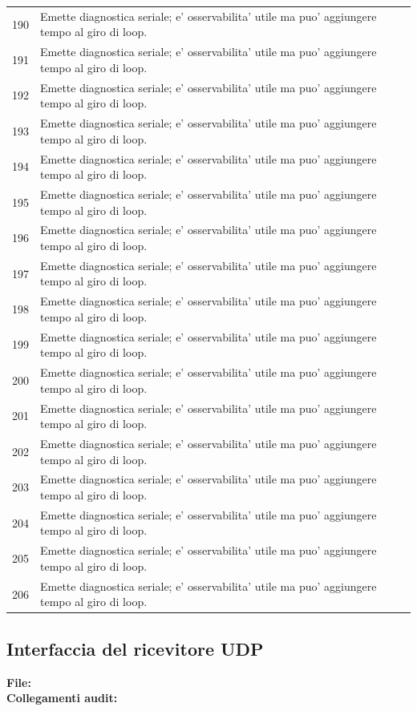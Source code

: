 \documentclass[11pt,a4paper]{article}
\newcommand{\codepath}[1]{\path{#1}}
\begin{document}
\begin{longtable}{p{}p{}}
190 & Emette diagnostica seriale; e' osservabilita' utile ma puo' aggiungere tempo al giro di loop. \\
191 & Emette diagnostica seriale; e' osservabilita' utile ma puo' aggiungere tempo al giro di loop. \\
192 & Emette diagnostica seriale; e' osservabilita' utile ma puo' aggiungere tempo al giro di loop. \\
193 & Emette diagnostica seriale; e' osservabilita' utile ma puo' aggiungere tempo al giro di loop. \\
194 & Emette diagnostica seriale; e' osservabilita' utile ma puo' aggiungere tempo al giro di loop. \\
195 & Emette diagnostica seriale; e' osservabilita' utile ma puo' aggiungere tempo al giro di loop. \\
196 & Emette diagnostica seriale; e' osservabilita' utile ma puo' aggiungere tempo al giro di loop. \\
197 & Emette diagnostica seriale; e' osservabilita' utile ma puo' aggiungere tempo al giro di loop. \\
198 & Emette diagnostica seriale; e' osservabilita' utile ma puo' aggiungere tempo al giro di loop. \\
199 & Emette diagnostica seriale; e' osservabilita' utile ma puo' aggiungere tempo al giro di loop. \\
200 & Emette diagnostica seriale; e' osservabilita' utile ma puo' aggiungere tempo al giro di loop. \\
201 & Emette diagnostica seriale; e' osservabilita' utile ma puo' aggiungere tempo al giro di loop. \\
202 & Emette diagnostica seriale; e' osservabilita' utile ma puo' aggiungere tempo al giro di loop. \\
203 & Emette diagnostica seriale; e' osservabilita' utile ma puo' aggiungere tempo al giro di loop. \\
204 & Emette diagnostica seriale; e' osservabilita' utile ma puo' aggiungere tempo al giro di loop. \\
205 & Emette diagnostica seriale; e' osservabilita' utile ma puo' aggiungere tempo al giro di loop. \\
206 & Emette diagnostica seriale; e' osservabilita' utile ma puo' aggiungere tempo al giro di loop. \\
\bottomrule
\end{longtable}


\clearpage
\subsection{Interfaccia del ricevitore UDP}
\textbf{File:} \codepath{tank/src/udpReceiver.h}\\
\textbf{Collegamenti audit:} \codepath{A-01, A-08, A-09, A-13, A-14}
\end{document}
